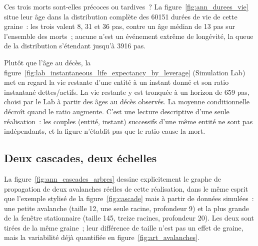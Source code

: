 Ces trois morts sont-elles précoces ou tardives~? La figure~\ref{fig:ann_durees_vie}
situe leur âge dans la distribution complète des 60151 durées de vie de
cette graine~: les trois valent 8, 31 et 36 pas, contre un âge médian de
13 pas sur l'ensemble des morts~; aucune n'est un événement extrême de
longévité, la queue de la distribution s'étendant jusqu'à 3916 pas.


Plutôt que l'âge au décès, la figure~\ref{fig:lab_instantaneous_life_expectancy_by_leverage}
(Simulation Lab) met en regard la vie restante d'une entité à un instant
donné et son ratio instantané dettes/actifs. La vie restante y est
tronquée à un horizon de 659 pas, choisi par le Lab à partir des âges au
décès observés. La moyenne conditionnelle décroît quand le ratio
augmente. C'est une lecture descriptive d'une seule réalisation~: les
couples (entité, instant) successifs d'une même entité ne sont pas
indépendants, et la figure n'établit pas que le ratio cause la mort.


\subsection{Deux cascades, deux échelles}
La figure~\ref{fig:ann_cascades_arbres} dessine explicitement le graphe
de propagation de deux avalanches réelles de cette réalisation, dans le
même esprit que l'exemple stylisé de la figure~\ref{fig:cascade} mais à
partir de données simulées~: une petite avalanche (taille 12, une seule
racine, profondeur 9) et la plus grande de la fenêtre stationnaire
(taille 145, treize racines, profondeur 20). Les deux sont tirées de la
même graine~; leur différence de taille n'est pas un effet de graine,
mais la variabilité déjà quantifiée en figure~\ref{fig:art_avalanches}.

